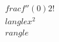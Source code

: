 \documentclass[preview]{standalone}
\begin{document}
\begin{align*}
\quad\\frac{f''(0)}{2!}\quad\\langle x^2 \quad\\rangle
\end{align*}
\end{document}
